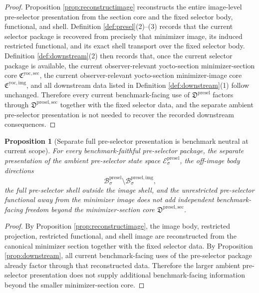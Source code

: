 \documentclass[11pt]{article}
\newcommand{\YoctoImageCore}{\mathfrak C^{\mathrm{yoc,img}}}
\newcommand{\YoctoMinSectionCore}{\mathfrak C^{\mathrm{yoc,sec}}}
\newcommand{\PreSelectorPackage}{\mathfrak D^{\mathrm{presel}}}
\newcommand{\PreSelectorSpace}[1]{\mathcal E_{#1}^{\mathrm{presel}}}
\newcommand{\PreSelectorBody}[1]{\mathcal B_{#1}^{\mathrm{presel}}}
\newcommand{\PreSelectorMinSectionCore}{\mathfrak D^{\mathrm{presel,sec}}}
\newcommand{\PreSelectorImgBody}[1]{\mathcal B_{#1}^{\mathrm{presel,img}}}
\newtheorem{proposition}{Proposition}
\begin{document}
\begin{proof}
Proposition \ref{prop:reconstructimage} reconstructs the entire image-level pre-selector presentation from the section core and the fixed selector body, functional, and shell. Definition \ref{def:presel}(2)--(3) records that the current selector package is recovered from precisely that minimizer image, its induced restricted functional, and its exact shell transport over the fixed selector body. Definition \ref{def:downstream}(2) then records that, once the current selector package is available, the current observer-relevant yocto-section minimizer-section core \(\YoctoMinSectionCore\), the current observer-relevant yocto-section minimizer-image core \(\YoctoImageCore\), and all downstream data listed in Definition \ref{def:downstream}(1) follow unchanged. Therefore every current benchmark-facing use of \(\PreSelectorPackage\) factors through \(\PreSelectorMinSectionCore\) together with the fixed selector data, and the separate ambient pre-selector presentation is not needed to recover the recorded downstream consequences.
\end{proof}

\begin{proposition}[Separate full pre-selector presentation is benchmark neutral at current scope]
\label{prop:neutral}
For every benchmark-faithful pre-selector package, the separate presentation of the ambient pre-selector state space \(\PreSelectorSpace{\sigma}\), the off-image body directions
\[
\PreSelectorBody{\sigma}\setminus\PreSelectorImgBody{\sigma},
\]
the full pre-selector shell outside the image shell, and the unrestricted pre-selector functional away from the minimizer image does not add independent benchmark-facing freedom beyond the minimizer-section core \(\PreSelectorMinSectionCore\).
\end{proposition}

\begin{proof}
By Proposition \ref{prop:reconstructimage}, the image body, restricted projection, restricted functional, and shell image are reconstructed from the canonical minimizer section together with the fixed selector data. By Proposition \ref{prop:downstream}, all current benchmark-facing uses of the pre-selector package already factor through that reconstructed data. Therefore the larger ambient pre-selector presentation does not supply additional benchmark-facing information beyond the smaller minimizer-section core.
\end{proof}
\end{document}
